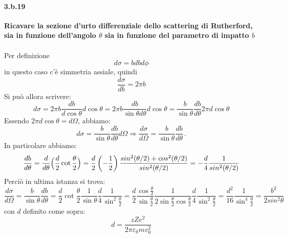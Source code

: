 \documentclass[twoside]{article}
\begin{document}
\paragraph{3.b.19}\textbf{Ricavare la sezione d’urto differenziale dello scattering di Rutherford, sia in
funzione dell’angolo $\theta$ sia in funzione del parametro di impatto $b$}\\ \\
Per definizione 
\begin{equation}
    d\sigma=b db d\phi
\end{equation}
in questo caso c'è simmetria assiale, quindi
\begin{equation}
\frac{d\sigma}{db}=2\pi b
\end{equation}
Si può allora scrivere:
\begin{equation*}
d\sigma=2\pi b \frac{db}{d\cos\theta} d\cos\theta=2\pi b \frac{db}{\sin\theta d\theta} d\cos\theta=\frac{b}{\sin\theta} \frac{db}{d\theta} 2\pi d\cos\theta
\end{equation*}
Essendo $2\pi d\cos\theta=d\Omega$, abbiamo:
\begin{equation}
d\sigma=\frac{b}{\sin\theta} \frac{db}{d\theta} d\Omega \Rightarrow \frac{d\sigma}{d\Omega}=\frac{b}{\sin\theta} \frac{db}{d\theta} \, .
\end{equation}
In particolare abbiamo:
\begin{equation*}
\frac{db}{d\theta}=\frac{d}{d\theta} \Bigl(\frac{d}{2}\cot\frac{\theta}{2}\Bigr)=\frac{d}{2}\left( -\frac{1}{2}\right)\frac{sin^2(\theta/2)+cos^2(\theta/2)}{sin^2(\theta/2)}=-\frac{d}{4}\frac{1}{sin^2(\theta/2)}
\end{equation*}
Perciò in ultima istanza si trova:
\begin{equation}
    \frac{d\sigma}{d\Omega}=\frac{b}{\sin\theta} \frac{db}{d\theta}  =\frac{d}{2} \cot\frac{\theta}{2} \frac{1}{\sin\theta} \frac{d}{4} \frac{1}{\sin^2\frac{\theta}{2}} =\frac{d}{2} \frac{\cos\frac{\theta}{2}}{\sin\frac{\theta}{2}} \frac{1}{2\sin\frac{\theta}{2}\cos\frac{\theta}{2}} \frac{d}{4} \frac{1}{\sin^2\frac{\theta}{2}} =\frac{d^2}{16} \frac{1}{\sin^4\frac{\theta}{2}}=\frac{b^2}{2sin^2\theta}
\end{equation}
con $d$ definito come sopra:
\begin{equation}
    d=\frac{zZe^2}{2\pi \varepsilon_0 m v_0^2}
\end{equation}
\end{document}
